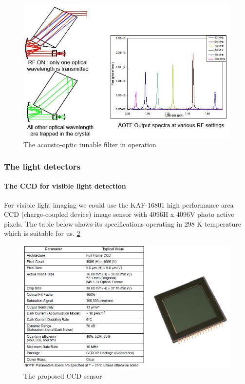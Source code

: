 \begin{figure}[htb]
  \centering
  \includegraphics[scale=0.5]{figures/BFfig/AOTF_operation}
  \caption{The acousto-optic tunable filter in operation}
  \label{fig:AOTF_operation}
\end{figure}

\subsubsection{The light detectors}

\paragraph{The CCD for visible light detection}

For visible light imaging we could use the KAF-16801 high performance area CCD (charge-coupled device) image sensor with 4096H x 4096V photo active pixels. The table below shows its specifications operating in 298 K temperature which is suitable for us.
\ref{fig:CCD_sensor}

\begin{figure}[htb]
  \centering
  \includegraphics[scale=0.6]{figures/BFfig/CCD_sensor}
  \caption{The proposed CCD sensor \cite{CCDsensor}}
  \label{fig:CCD_sensor}
\end{figure}


